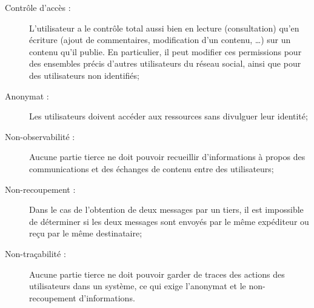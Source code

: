 \begin{description}

\item[Contrôle d'accès :] L'utilisateur a le contrôle total aussi bien en
lecture (consultation) qu'en écriture (ajout de commentaires, modification d'un
contenu, \ldots) sur un contenu qu'il publie. En particulier, il peut modifier
ces permissions pour des ensembles précis d'autres utilisateurs du réseau
social, ainsi que pour des utilisateurs non identifiés;

\item[Anonymat :] Les utilisateurs doivent accéder aux ressources
sans divulguer leur identité;

\item[Non-observabilité :] Aucune partie tierce ne doit pouvoir recueillir
d'informations à propos des communications et des échanges de contenu entre des
utilisateurs;

\item[Non-recoupement :] Dans le cas de l’obtention de deux messages par un
tiers, il est impossible de déterminer si les deux messages sont envoyés par le
même expéditeur ou reçu par le même destinataire;

\item[Non-traçabilité :] Aucune partie tierce ne doit pouvoir garder de traces des
actions des utilisateurs dans un système, ce qui exige l'anonymat et le
non-recoupement d'informations.

\end{description}
